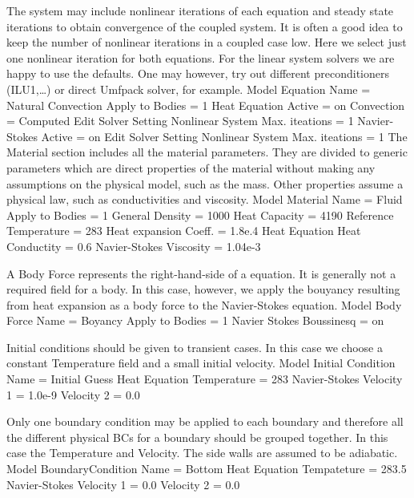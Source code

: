The system may include nonlinear iterations of each equation and steady state iterations 
to obtain convergence of the coupled system. It is often a good idea to keep the number of 
nonlinear iterations in a coupled case low. Here we select just one nonlinear iteration
for both equations.
For the linear system solvers we are happy to use the defaults. One may however, try out different
preconditioners (ILU1,\ldots) or direct Umfpack solver, for example.
\ttbegin
Model
  Equation
    Name = Natural Convection
    Apply to Bodies = 1
    Heat Equation
      Active = on
      Convection = Computed
      Edit Solver Setting
        Nonlinear System
          Max. iteations = 1
    Navier-Stokes 
      Active = on
      Edit Solver Setting
        Nonlinear System
          Max. iteations = 1
\ttend        
The Material section includes all the material parameters.
They are divided to generic parameters which are direct properties of the material
without making any assumptions on the physical model, such as the mass. Other properties assume
a physical law, such as conductivities and viscosity.      
\ttbegin
Model
  Material
    Name = Fluid
    Apply to Bodies = 1 
    General    
      Density = 1000
      Heat Capacity = 4190
      Reference Temperature = 283
      Heat expansion Coeff. = 1.8e.4
    Heat Equation
      Heat Conductity = 0.6
    Navier-Stokes
      Viscosity = 1.04e-3
\ttend

A Body Force represents the right-hand-side of a equation. It is generally 
not a required field for a body. In this case, however, we apply the bouyancy resulting from
heat expansion as a body force to the Navier-Stokes equation.
\ttbegin
Model
  Body Force
    Name = Boyancy
    Apply to Bodies = 1
    Navier Stokes
      Boussinesq = on
\ttend    

Initial conditions should be given to transient cases. In this case we choose a constant Temperature field
and a small initial velocity. 
\ttbegin
Model
  Initial Condition 
    Name = Initial Guess
    Heat Equation
      Temperature = 283
    Navier-Stokes
      Velocity 1 = 1.0e-9
      Velocity 2 = 0.0
\ttend

Only one boundary condition may be applied to each boundary and therefore all the 
different physical BCs for a boundary should be grouped together. In this case the
Temperature and Velocity. The side walls are assumed to be adiabatic.
\ttbegin
Model
  BoundaryCondition
    Name = Bottom
    Heat Equation
      Tempateture = 283.5
    Navier-Stokes 
      Velocity 1 = 0.0
      Velocity 2 = 0.0
 
